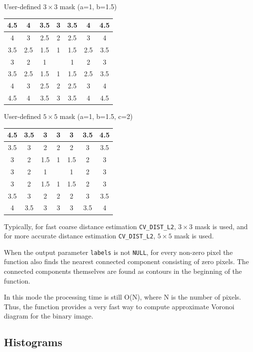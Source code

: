 User-defined $3 \times 3$ mask (a=1, b=1.5)

\begin{tabular}{| c | c | c | c | c | c | c |}
\hline
4.5 & 4 & 3.5 & 3 & 3.5 & 4 & 4.5\\ \hline
4 & 3 & 2.5 & 2 & 2.5 & 3 & 4\\ \hline
3.5 & 2.5 & 1.5 & 1 & 1.5 & 2.5 & 3.5\\ \hline
3 & 2 & 1 &     & 1 & 2 & 3\\ \hline
3.5 & 2.5 & 1.5 & 1 & 1.5 & 2.5 & 3.5\\ \hline
4 & 3 & 2.5 & 2 & 2.5 & 3 & 4\\ \hline
4.5 & 4 & 3.5 & 3 & 3.5 & 4 & 4.5\\ \hline
\end{tabular}

User-defined $5 \times 5$ mask (a=1, b=1.5, c=2)

\begin{tabular}{| c | c | c | c | c | c | c |}
\hline
4.5 & 3.5 & 3 & 3 & 3 & 3.5 & 4.5\\ \hline
3.5 & 3 & 2 & 2 & 2 & 3 & 3.5\\ \hline
3 & 2 & 1.5 & 1 & 1.5 & 2 & 3\\ \hline
3 & 2 & 1 & & 1 & 2 & 3\\ \hline
3 & 2 & 1.5 & 1 & 1.5 & 2 & 3\\ \hline
3.5 & 3 & 2 & 2 & 2 & 3 & 3.5\\ \hline
4 & 3.5 & 3 & 3 & 3 & 3.5 & 4\\ \hline
\end{tabular}


Typically, for fast coarse distance estimation \texttt{CV\_DIST\_L2},
$3\times 3$ mask is used, and for more accurate distance estimation
\texttt{CV\_DIST\_L2}, $5\times 5$ mask is used.

When the output parameter \texttt{labels} is not \texttt{NULL}, for
every non-zero pixel the function also finds the nearest connected
component consisting of zero pixels. The connected components
themselves are found as contours in the beginning of the function.

In this mode the processing time is still O(N), where N is the number of pixels. Thus, the function provides a very fast way to compute approximate Voronoi diagram for the binary image.


\subsection{Histograms}

